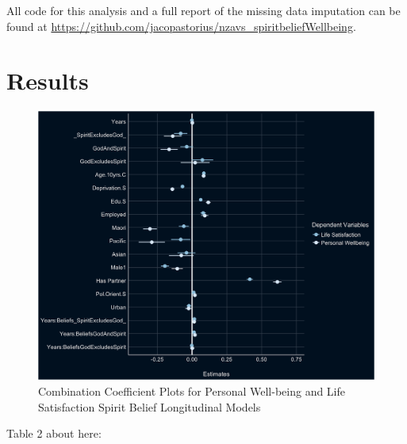 \documentclass[
  english,
  man]{apa6}
\begin{document}
All code for this analysis and a full report of the missing data imputation can be found at \url{https://github.com/jacopastorius/nzavs_spiritbeliefWellbeing}.

\hypertarget{results}{%
\section{Results}\label{results}}

\begin{figure}
\includegraphics[width=6.4in]{Figs/USEcoefficientplots-1} \caption{Combination Coefficient Plots for Personal Well-being and Life Satisfaction Spirit Belief Longitudinal Models}\label{fig:unnamed-chunk-1}
\end{figure}

Table 2 about here:
\end{document}

